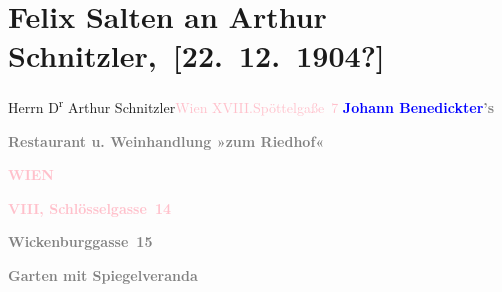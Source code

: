 

\renewcommand{\erwaehntePersonen}{Personen: Johann Benedickter, Anna Katharina Rehmann, Ottilie Salten}
\renewcommand{\erwaehnteOrte}{Orte: Edmund-Weiß-Gasse 7, Riedhof, Schlösselgasse, Wickenburggasse, Wien, XVIII., Währing}
\renewcommand{\erwaehnteWerke}{Werke: Symphonie Nr. 3 D-Moll}
\section[ Felix Salten an Arthur Schnitzler, {[}22. 12. 1904?{]}]{Felix Salten an Arthur Schnitzler, {[}22. 12. 1904?{]}}
\nopagebreak{}
\rehead{ }\normalsize\beginnumbering{}
\toendnotes[C]{\smallbreak\pagebreak[2]}
\toendnotes[C]{\smallbreak}\pstart{}{\pb}Herrn D\textsuperscript{r} Arthur Schnitzler\pend{}\pstart{}\textcolor{pink}{Wien XVIII.}{}\ledrightnote{\textcolor{pink}{XVIII., Währing}}\pend{}\pstart{}\textcolor{pink}{Spöttelgaße 7}{}\ledrightnote{\textcolor{pink}{Edmund-Weiß-Gasse 7}}\pend{}
{\bigskip}
\pstart
           \noindent{}\centering{}{\pb}\textcolor{gray}{\textbf{\textcolor{blue}{Johann Benedickter}{}\ledrightnote{\textcolor{blue}{Johann Benedickter}}’s}}\pend
           
\pstart
           \noindent{}\centering{}\textcolor{pink}{\textcolor{gray}{\textbf{Restaurant u. Weinhandlung »zum Riedhof«}}}{}\ledrightnote{\textcolor{pink}{Riedhof}}\pend
           
\pstart
           \noindent{}\centering{}\textcolor{gray}{\textbf{\textcolor{pink}{WIEN}{}\ledrightnote{\textcolor{pink}{Wien}}}}\pend
           
\pstart
           \noindent{}\centering{}\textcolor{gray}{\textbf{\textcolor{pink}{VIII, Schlösselgasse 14}{}\ledrightnote{\textcolor{pink}{Schlösselgasse}}}}\pend
           
\pstart
           \noindent{}\centering{}\textcolor{pink}{\textcolor{gray}{\textbf{Wickenburggasse 15}}}{}\ledrightnote{\textcolor{pink}{Wickenburggasse}}\pend
           
\pstart
           \noindent{}\centering{}\textcolor{gray}{\textbf{Garten mit Spiegelveranda}}\pend
           
